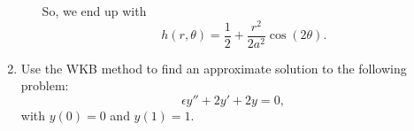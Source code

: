 \documentclass[10pt,letterpaper]{report}
\begin{document}
\begin{enumerate}
\begin{enumerate}
    So, we end up with
    \[
    h(r,\theta) = \frac{1}{2} + \frac{r^2}{2a^2}\cos(2\theta).
    \]
\end{enumerate}

\item 
\begin{qbox}
Use the WKB method to find an approximate solution to the following problem:
\[
\epsilon y'' + 2y' + 2y = 0,
\]
with $y(0) = 0$ and $y(1) = 1$.
\end{qbox}


\end{enumerate}
\end{document}
